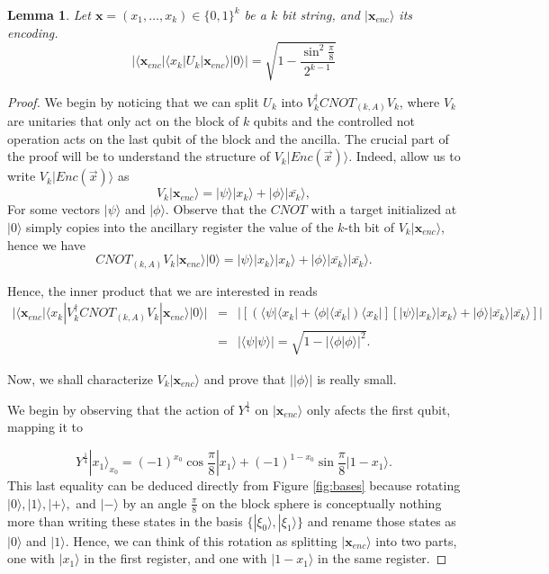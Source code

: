 \documentclass{article}
\newtheorem{lemma}[theorem]{Lemma}
\theoremstyle{definition}
\newcommand{\ket}[1]{|#1\rangle}
\newcommand{\bra}[1]{\langle#1|}
\newcommand{\braket}[2]{\langle{#1}|{#2}\rangle}
\begin{document}
\begin{lemma}
Let $\textbf{x}=(x_1,\dots,x_k)\in\{0,1\}^k$ be a $k$ bit string, and $\ket{\textbf{x}_{enc}}$ its encoding.
\begin{equation}
|\bra{\textbf{x}_{enc}}\bra{x_k}U_k\ket{\textbf{x}_{enc}}\ket{0}|= \sqrt{1-\frac{\sin^2\frac{\pi}{8}}{2^{k-1}}}
\end{equation}
\label{lem:bit_extract}
\end{lemma}
\begin{proof}
We begin by noticing that we can split $U_k$ into $V_k^\dagger CNOT_{(k,A)}V_k$, where $V_k$ are unitaries that only act on the block of $k$ qubits and the controlled not operation acts on the last qubit of the block and the ancilla. The crucial part of the proof will be to understand the structure of  $V_k\ket{Enc(\vec{x})}$. Indeed, allow us to write  $V_k\ket{Enc(\vec{x})}$ as
\[V_k\ket{\textbf{x}_{enc}}=\ket{\psi}\ket{x_k}+\ket{\phi}\ket{\bar{x_k}},\]
For some vectors $\ket{\psi}$ and $\ket{\phi}$. Observe that the $CNOT$ with a target initialized at $\ket{0}$ simply copies into the ancillary register the value of the $k$-th bit of $V_k\ket{\textbf{x}_{enc}}$, hence we have
\begin{equation}
CNOT_{(k,A)}V_k\ket{\textbf{x}_{enc}}\ket{0}=\ket{\psi}\ket{x_k}\ket{x_k}+\ket{\phi}\ket{\bar{x_k}}\ket{\bar{x_k}}.
\end{equation}

Hence, the inner product that we are interested in reads
\begin{eqnarray}
|\bra{\textbf{x}_{enc}}\bra{x_k}V_k^\dagger CNOT_{(k,A)}V_k\ket{\textbf{x}_{enc}}\ket{0}|&=&|\left[\left(\bra{\psi}\bra{x_k}+\bra{\phi}\bra{\bar{x_k}}\right)\bra{x_k}\right]\left[\ket{\psi}\ket{x_k}\ket{x_k}+\ket{\phi}\ket{\bar{x_k}}\ket{\bar{x_k}}\right]|\\
&=&|\braket{\psi}{\psi}|=\sqrt{1-|\braket{\phi}{\phi}|^2}.
\end{eqnarray}

Now, we shall characterize $V_k\ket{\textbf{x}_{enc}}$ and prove that $|\ket{\phi}|$ is really small.

We begin by observing that the action of $Y^{\frac{1}{4}}$ on $\ket{\textbf{x}_{enc}}$ only afects the first qubit, mapping it to

\[Y^\frac{1}{4}\ket{x_1}_{x_{0}}=(-1)^{x_0}\cos\frac{\pi}{8}\ket{x_1}+(-1)^{1-x_0}\sin\frac{\pi}{8}\ket{1-x_1}.\]
This last equality can be deduced directly from Figure \ref{fig:bases} because rotating $\ket{0}, \ket{1}, \ket{+},$ and $\ket{-}$ by an angle $\frac{\pi}{8}$ on the block sphere is conceptually nothing more than writing these states in the basis $\{\ket{\xi_0}, \ket{\xi_1}\}$ and rename those states as $\ket{0}$ and $\ket{1}$. Hence, we can think of this rotation as splitting $\ket{\textbf{x}_{enc}}$ into two parts, one with $\ket{x_1}$ in the first register, and one with $\ket{1-x_1}$ in the same register.


\end{proof}
\end{document}
